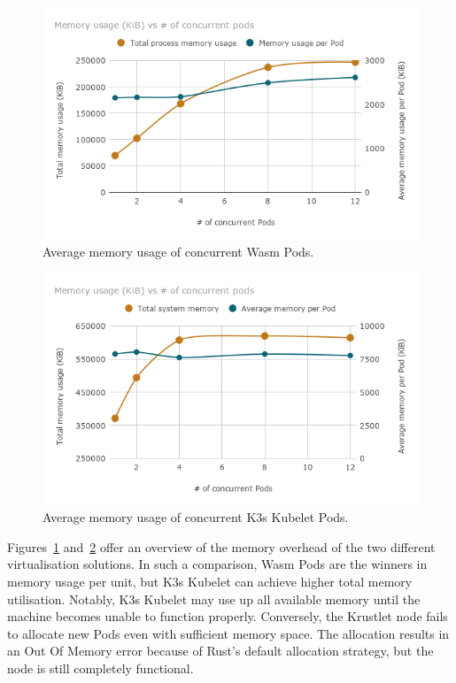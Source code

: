 \begin{figure}[ht]
\centering
\includegraphics[width=\columnwidth]{figures/b-krustlet-2}
\caption{Average memory usage of concurrent Wasm Pods.}
\label{fig:b-krustlet-2}
\end{figure}

\begin{figure}[ht]
\centering
\includegraphics[width=\columnwidth]{figures/b-krustlet-3}
\caption{Average memory usage of concurrent K3s Kubelet Pods.}
\label{fig:b-krustlet-3}
\end{figure}

Figures~\ref{fig:b-krustlet-2} and~\ref{fig:b-krustlet-3} offer an overview of the memory overhead of the two different virtualisation solutions. In such a comparison, Wasm Pods are the winners in memory usage per unit, but K3s Kubelet can achieve higher total memory utilisation. Notably, K3s Kubelet may use up all available memory until the machine becomes unable to function properly. Conversely, the Krustlet node fails to allocate new Pods even with sufficient memory space. The allocation results in an Out Of Memory error because of Rust's default allocation strategy, but the node is still completely functional.

